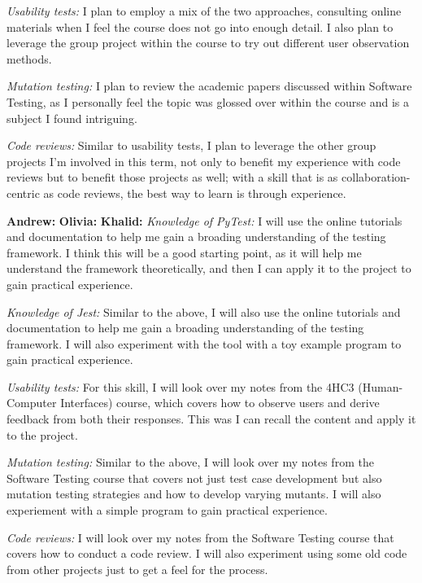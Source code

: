 \documentclass[12pt, titlepage]{article}
\begin{document}
\begin{enumerate}
  \textit{Usability tests:} I plan to employ a mix of the two approaches, consulting online materials when I feel the course does not go into enough detail. I also plan to leverage the group project within the course to try out different user observation methods.

  \textit{Mutation testing:} I plan to review the academic papers discussed within Software Testing, as I personally feel the topic was glossed over within the course and is a subject I found intriguing. 

  \textit{Code reviews:} Similar to usability tests, I plan to leverage the other group projects I'm involved in this term, not only to benefit my experience with code reviews but to benefit those projects as well; with a skill that is as collaboration-centric as code reviews, the best way to learn is through experience.
  
  \textbf{Andrew: }
  \newline
  \textbf{Olivia: }
  \newline
  \textbf{Khalid:}
  \textit{Knowledge of PyTest:} I will use the online tutorials and documentation to help me gain a broading understanding of the testing framework. I think this will be a good starting point, as it will help me understand the framework theoretically, and then I can apply it to the project to gain practical experience.
  
  \textit{Knowledge of Jest:} Similar to the above, I will also use the online tutorials and documentation to help me gain a broading understanding of the testing framework. I will also experiment with the tool with a toy example program to gain practical experience.
  
  \textit{Usability tests:} For this skill, I will look over my notes from the 4HC3 (Human-Computer Interfaces) course, which covers how to observe users and derive feedback from both their responses. This was I can recall the content and apply it to the project.
  
  \textit{Mutation testing:} Similar to the above, I will look over my notes from the Software Testing course that covers not just test case development but also mutation testing strategies and how to develop varying mutants. I will also experiement with a simple program to gain practical experience.
  
  \textit{Code reviews:} I will look over my notes from the Software Testing course that covers how to conduct a code review. I will also experiment using some old code from other projects just to get a feel for the process.
  
\end{enumerate}
\end{document}
